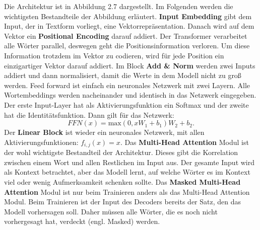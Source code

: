 \documentclass[12pt,letterpaper,ngerman]{article}
\begin{document}
Die Architektur ist in Abbildung 2.7 dargestellt. Im Folgenden werden 
die wichtigsten Bestandteile der Abbildung erläutert. {\bf Input Embedding}
gibt dem Input, der in Textform vorliegt, eine Vektorrepräsentation.
Danach wird auf dem Vektor ein {\bf Positional Encoding} darauf addiert.
Der Transformer verarbeitet alle Wörter parallel, deswegen geht die 
Positionsinformation verloren. Um diese Information trotzdem im Vektor 
zu codieren, wird für jede Position ein einzigartiger Vektor darauf 
addiert. Im Block {\bf Add \& Norm} werden zwei Inputs addiert und dann 
normalisiert, damit die Werte in dem Modell nicht zu groß werden.
Feed forward ist einfach ein neuronales Netzwerk mit zwei Layern.
Alle Wortembeddings werden nacheinander und identisch in das Netzwerk 
eingegeben. Der erste Input-Layer hat als Aktivierungsfunktion ein 
Softmax und der zweite hat die Identitätsfunktion.
Dann gilt für das Netzwerk:
\[
  FFN(x) =\text{max}(0, xW_1 + b_1)W_2 + b_2.
\]
Der {\bf Linear Block} ist wieder ein neuronales Netzwerk, mit allen
Aktivierungsfunktionen: $ f_{i,j}(x) = x $. 
Das {\bf Multi-Head Attention} Modul ist der wohl wichtigste Bestandteil der 
Architektur. Dieses gibt die Korrelation zwischen einem Wort und allen
Restlichen im Input aus. Der gesamte Input wird als Kontext betrachtet,
aber das Modell lernt, auf welche Wörter es im Kontext viel oder wenig
Aufmerksamkeit schenken sollte. Das {\bf Masked Multi-Head Attention}
Modul ist nur beim Trainieren anders als das Multi-Head Attention Modul.
Beim Trainieren ist der Input des Decoders bereits der Satz,
den das Modell vorhersagen soll. Daher müssen alle Wörter, 
die es noch nicht vorhergesagt hat, verdeckt (engl. Masked) werden.
\end{document}
